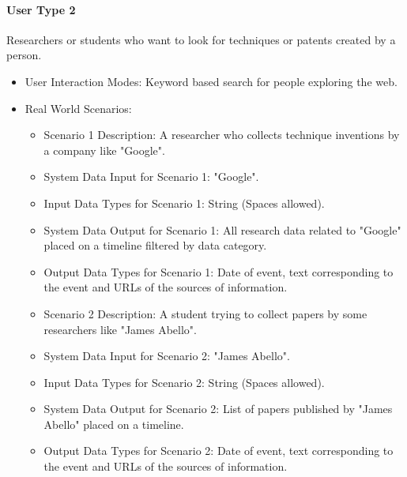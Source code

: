\paragraph{User Type 2}
Researchers or students who want to look for techniques or patents created by a
person.
\begin{itemize}
\item User Interaction Modes: Keyword based search for people exploring the web.
\item Real World Scenarios:
  \begin{itemize}
  \item Scenario 1 Description: A researcher who collects technique inventions
    by a company like "Google".
  \item System Data Input for Scenario 1: "Google".
  \item Input Data Types for Scenario 1: String (Spaces allowed).
  \item System Data Output for Scenario 1: All research data related to
    "Google" placed on a timeline filtered by data category.
  \item Output Data Types for Scenario 1: Date of event, text corresponding to
    the event and URLs of the sources of information.
  \item Scenario 2 Description: A student trying to collect papers by some
    researchers like "James Abello".
  \item System Data Input for Scenario 2: "James Abello".
  \item Input Data Types for Scenario 2: String (Spaces allowed).
  \item System Data Output for Scenario 2: List of papers published by "James
    Abello" placed on a timeline.
  \item Output Data Types for Scenario 2: Date of event, text corresponding to
    the event and URLs of the sources of information.
  \end{itemize}
\end{itemize}

